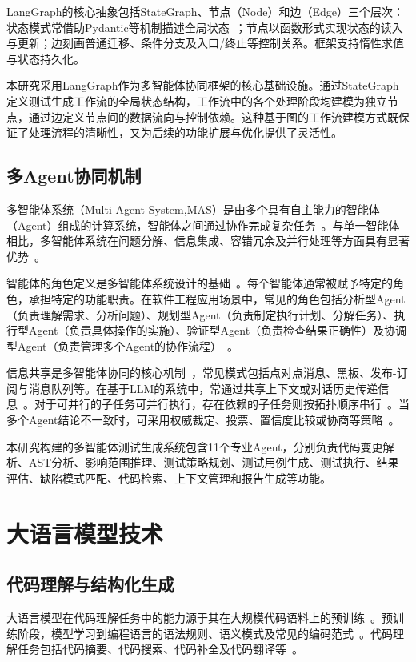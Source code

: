 LangGraph的核心抽象包括StateGraph、节点（Node）和边（Edge）三个层次：状态模式常借助Pydantic等机制描述全局状态~\cite{PydanticDoc}；节点以函数形式实现状态的读入与更新；边刻画普通迁移、条件分支及入口/终止等控制关系。框架支持惰性求值与状态持久化。

本研究采用LangGraph作为多智能体协同框架的核心基础设施。通过StateGraph定义测试生成工作流的全局状态结构，工作流中的各个处理阶段均建模为独立节点，通过边定义节点间的数据流向与控制依赖。这种基于图的工作流建模方式既保证了处理流程的清晰性，又为后续的功能扩展与优化提供了灵活性。

\subsection{多Agent协同机制}
多智能体系统（Multi-Agent System,\allowbreak MAS）是由多个具有自主能力的智能体（Agent）组成的计算系统，智能体之间通过协作完成复杂任务~\cite{Wooldridge2009MAS}。与单一智能体相比，多智能体系统在问题分解、信息集成、容错冗余及并行处理等方面具有显著优势~\cite{Stone2000MultiAgent}。

智能体的角色定义是多智能体系统设计的基础~\cite{Kraus2008AgentRoles}。每个智能体通常被赋予特定的角色，承担特定的功能职责。在软件工程应用场景中，常见的角色包括分析型Agent（负责理解需求、分析问题）、规划型Agent（负责制定执行计划、分解任务）、执行型Agent（负责具体操作的实施）、验证型Agent（负责检查结果正确性）及协调型Agent（负责管理多个Agent的协作流程）~\cite{Wu2023AutoGen}。

信息共享是多智能体协同的核心机制~\cite{Franklin1996AgentComm}，常见模式包括点对点消息、黑板、发布-订阅与消息队列等。在基于LLM的系统中，常通过共享上下文或对话历史传递信息~\cite{Hong2023MetaGPT}。对于可并行的子任务可并行执行，存在依赖的子任务则按拓扑顺序串行~\cite{Fagin2003StateSync}。当多个Agent结论不一致时，可采用权威裁定、投票、置信度比较或协商等策略~\cite{Ossowski2014Consensus}。

本研究构建的多智能体测试生成系统包含11个专业Agent，分别负责代码变更解析、AST分析、影响范围推理、测试策略规划、测试用例生成、测试执行、结果评估、缺陷模式匹配、代码检索、上下文管理和报告生成等功能。

\section{大语言模型技术}
\subsection{代码理解与结构化生成}
大语言模型在代码理解任务中的能力源于其在大规模代码语料上的预训练~\cite{Fan2023LLMSurvey}。预训练阶段，模型学习到编程语言的语法规则、语义模式及常见的编码范式~\cite{Feng2020CodeBERT}。代码理解任务包括代码摘要、代码搜索、代码补全及代码翻译等~\cite{Wang2021CodeT5}。

